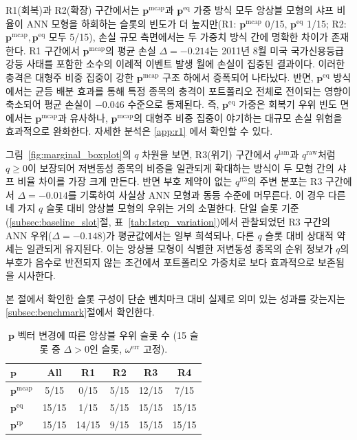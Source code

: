 \documentclass[eng]{kjas3}
\begin{document}
R1(회복)과 R2(확장) 구간에서는 $\mathbf{p}^{\mathrm{mcap}}$과 $\mathbf{p}^{\mathrm{eq}}$ 가중 방식 모두 앙상블 모형의 샤프 비율이 ANN 모형을 하회하는 슬롯의 빈도가 더 높지만(R1: $\mathbf{p}^{\mathrm{mcap}}$ 0/15, $\mathbf{p}^{\mathrm{eq}}$ 1/15; R2: $\mathbf{p}^{\mathrm{mcap}}, \mathbf{p}^{\mathrm{eq}}$ 모두 5/15), 손실 규모 측면에서는 두 가중치 방식 간에 명확한 차이가 존재한다. R1 구간에서 $\mathbf{p}^{\mathrm{mcap}}$의 평균 손실 $\Delta = -0.214$는 2011년 8월 미국 국가신용등급 강등 사태를 포함한 소수의 이례적 이벤트 발생 월에 손실이 집중된 결과이다. 이러한 충격은 대형주 비중 집중이 강한 $\mathbf{p}^{\mathrm{mcap}}$ 구조 하에서 증폭되어 나타났다. 반면, $\mathbf{p}^{\mathrm{eq}}$ 방식에서는 균등 배분 효과를 통해 특정 종목의 충격이 포트폴리오 전체로 전이되는 영향이 축소되어 평균 손실이 $-0.046$ 수준으로 통제된다. 즉, $\mathbf{p}^{\mathrm{eq}}$ 가중은 회복기 우위 빈도 면에서는 $\mathbf{p}^{\mathrm{mcap}}$과 유사하나, $\mathbf{p}^{\mathrm{mcap}}$의 대형주 비중 집중이 야기하는 대규모 손실 위험을 효과적으로 완화한다. 자세한 분석은 \ref{app:r1} 에서 확인할 수 있다.

그림~\ref{fig:marginal_boxplot}의 $q$ 차원을 보면, R3(위기) 구간에서 $q^{\mathrm{lam}}$과 $q^{\mathrm{raw}}$처럼 $q \geq 0$이 보장되어 저변동성 종목의 비중을 일관되게 확대하는 방식이 두 모형 간의 샤프 비율 차이를 가장 크게 만든다. 
반면 부호 제약이 없는 $q^{\mathrm{ff3}}$의 주변 분포는 R3 구간에서 $\Delta = -0.014$를 기록하여 사실상 ANN 모형과 동등 수준에 머무른다. 이 경우 다른 네 가지 $q$ 슬롯 대비 앙상블 모형의 우위는 거의 소멸한다. 단일 슬롯 기준 (\ref{subsec:baseline_slot}절, 표~\ref{tab:1step_variation})에서 관찰되었던 R3 구간의 ANN 우위($\Delta = -0.148$)가 평균값에서는 일부 희석되나, 다른 $q$ 슬롯 대비 상대적 약세는 일관되게 유지된다. 이는 앙상블 모형이 식별한 저변동성 종목의 순위 정보가 $q$의 부호가 음수로 반전되지 않는 조건에서 포트폴리오 가중치로 보다 효과적으로 보존됨을 시사한다.

본 절에서 확인한 슬롯 구성이 단순 벤치마크 대비 실제로 의미 있는 성과를 갖는지는 \ref{subsec:benchmark}절에서 확인한다.

\begin{table}[t]
\centering
\caption{$\mathbf{p}$ 벡터 변경에 따른 앙상블 우위 슬롯 수 (15 슬롯 중 $\Delta > 0$인 슬롯, $\omega^{\mathrm{err}}$ 고정).}
\label{tab:p_matrix_win}
\centering
\renewcommand{\arraystretch}{1.15}
\begin{tabular}{l ccccc}
\toprule
$\mathbf{p}$ & All & R1 & R2 & R3 & R4 \\
\midrule
$\mathbf{p}^{\mathrm{mcap}}$ & 5/15  & \cellcolor{negred!50}0/15  & 5/15 & \cellcolor{posgreen!50}12/15 & 7/15 \\
$\mathbf{p}^{\mathrm{eq}}$   & \cellcolor{posgreen!50}15/15 & \cellcolor{negred!50}1/15  & 5/15 & \cellcolor{posgreen!50}15/15 & \cellcolor{posgreen!50}15/15 \\
$\mathbf{p}^{\mathrm{rp}}$   & \cellcolor{posgreen!50}15/15 & \cellcolor{posgreen!50}14/15 & 9/15 & \cellcolor{posgreen!50}15/15 & \cellcolor{posgreen!50}15/15 \\
\bottomrule
\end{tabular}
\end{table}
\end{document}
